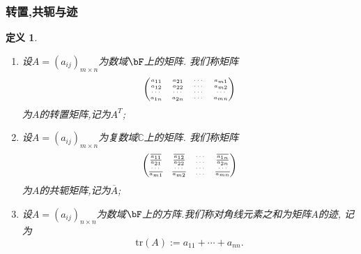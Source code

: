 \documentclass{article}
\newtheorem{definition}[theorem]{定义}
\renewcommand{\blue }[1]{{\textcolor[rgb]{0,0,1}{#1}}}
\begin{document}
\subsubsection{转置,共轭与迹}
\begin{definition}
\begin{enumerate}
\item 设$A=(a_{ij})_{m\times n}$为数域$\bF$上的矩阵. 我们称矩阵
\[\tiny \begin{pmatrix} a_{11}& a_{21}&\cdots&a_{m1}\\a_{12}& a_{22}&\cdots&a_{m2}\\\cdots&\cdots&\cdots&\cdots\\a_{1n}& a_{2n}&\cdots&a_{mn}\\
\end{pmatrix}\]
为$A$的\blue{转置矩阵},记为$A^T$;
\item 设$A=(a_{ij})_{m\times n}$为复数域$\mathbb C$上的矩阵. 我们称矩阵
\[\tiny \begin{pmatrix}
\overline{a_{11}}&\overline{a_{12}}&\cdots&\overline{a_{1n}}\\
\overline{a_{21}}&\overline{a_{22}}&\cdots&\overline{a_{2n}}\\
\cdots&\cdots&\cdots&\cdots\\
\overline{a_{m1}}&\overline{a_{m2}}&\cdots&\overline{a_{mn}}\\
\end{pmatrix}\]
为$A$的\blue{共轭矩阵},记为$\overline{A}$;
\item 设$A=(a_{ij})_{n\times n}$为数域$\bF$上的方阵.我们称对角线元素之和为矩阵$A$的\blue{迹}, 记为
\[\mathrm{tr}(A):=a_{11}+\cdots+a_{nn}.\]
\end{enumerate}
\end{definition}
\end{document}
